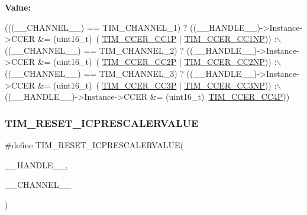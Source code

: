{\bfseries Value\+:}
\begin{DoxyCode}
(((\_\_CHANNEL\_\_) == TIM\_CHANNEL\_1) ? ((\_\_HANDLE\_\_)->Instance->CCER &= (uint16\_t)~(
      \mbox{\hyperlink{group___peripheral___registers___bits___definition_ga0ca0aedba14241caff739afb3c3ee291}{TIM\_CCER\_CC1P}} | \mbox{\hyperlink{group___peripheral___registers___bits___definition_ga403fc501d4d8de6cabee6b07acb81a36}{TIM\_CCER\_CC1NP}})) :\(\backslash\)
 ((\_\_CHANNEL\_\_) == TIM\_CHANNEL\_2) ? ((\_\_HANDLE\_\_)->Instance->CCER &= (uint16\_t)~(
      \mbox{\hyperlink{group___peripheral___registers___bits___definition_ga3136c6e776c6066509d298b6a9b34912}{TIM\_CCER\_CC2P}} | \mbox{\hyperlink{group___peripheral___registers___bits___definition_ga387de559d8b16b16f3934fddd2aa969f}{TIM\_CCER\_CC2NP}})) :\(\backslash\)
 ((\_\_CHANNEL\_\_) == TIM\_CHANNEL\_3) ? ((\_\_HANDLE\_\_)->Instance->CCER &= (uint16\_t)~(
      \mbox{\hyperlink{group___peripheral___registers___bits___definition_ga6220a5cd34c7a7a39e10c854aa00d2e5}{TIM\_CCER\_CC3P}} | \mbox{\hyperlink{group___peripheral___registers___bits___definition_ga4029686d3307111d3f9f4400e29e4521}{TIM\_CCER\_CC3NP}})) :\(\backslash\)
 ((\_\_HANDLE\_\_)->Instance->CCER &= (uint16\_t)~\mbox{\hyperlink{group___peripheral___registers___bits___definition_ga3faf23dc47e1b0877352d7f5a00f72e1}{TIM\_CCER\_CC4P}}))
\end{DoxyCode}
\mbox{\label{group___t_i_m___exported___macros_ga18ded32faf42c8981c8d2970bb02e126}} 
\subsubsection{\texorpdfstring{T\+I\+M\+\_\+\+R\+E\+S\+E\+T\+\_\+\+I\+C\+P\+R\+E\+S\+C\+A\+L\+E\+R\+V\+A\+L\+UE}{TIM\_RESET\_ICPRESCALERVALUE}}
{\footnotesize\ttfamily \#define T\+I\+M\+\_\+\+R\+E\+S\+E\+T\+\_\+\+I\+C\+P\+R\+E\+S\+C\+A\+L\+E\+R\+V\+A\+L\+UE(\begin{DoxyParamCaption}\item[{}]{\+\_\+\+\_\+\+H\+A\+N\+D\+L\+E\+\_\+\+\_\+,  }\item[{}]{\+\_\+\+\_\+\+C\+H\+A\+N\+N\+E\+L\+\_\+\+\_\+ }\end{DoxyParamCaption})}

